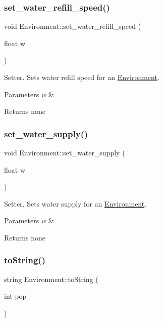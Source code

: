 \subsubsection{\texorpdfstring{set\+\_\+water\+\_\+refill\+\_\+speed()}{set\_water\_refill\_speed()}}
{\footnotesize\ttfamily void Environment\+::set\+\_\+water\+\_\+refill\+\_\+speed (\begin{DoxyParamCaption}\item[{float}]{w }\end{DoxyParamCaption})}

Setter. Sets water refill speed for an \hyperlink{class_environment}{Environment}. 
\begin{DoxyParams}{Parameters}
{\em w} & \\
\hline
\end{DoxyParams}
\begin{DoxyReturn}{Returns}
none 
\end{DoxyReturn}
\mbox{\label{class_environment_a68b5b4471d4eed0e6ce5b27f3182a2c2}} 
\subsubsection{\texorpdfstring{set\+\_\+water\+\_\+supply()}{set\_water\_supply()}}
{\footnotesize\ttfamily void Environment\+::set\+\_\+water\+\_\+supply (\begin{DoxyParamCaption}\item[{float}]{w }\end{DoxyParamCaption})}

Setter. Sets water supply for an \hyperlink{class_environment}{Environment}. 
\begin{DoxyParams}{Parameters}
{\em w} & \\
\hline
\end{DoxyParams}
\begin{DoxyReturn}{Returns}
none 
\end{DoxyReturn}
\mbox{\label{class_environment_ad8f542ef50c512f13d66ae3cd75071d5}} 
\subsubsection{\texorpdfstring{to\+String()}{toString()}}
{\footnotesize\ttfamily string Environment\+::to\+String (\begin{DoxyParamCaption}\item[{int}]{pop }\end{DoxyParamCaption})}

